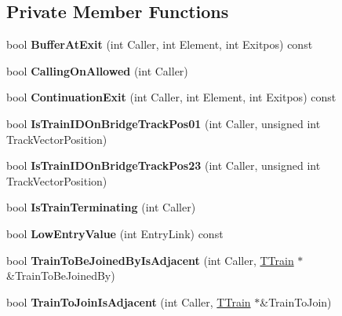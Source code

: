 \subsection*{Private Member Functions}
\begin{DoxyCompactItemize}
\item 
\mbox{\label{class_t_train_a2e3e9fd7367a9333b7550b225d328d13}} 
bool {\bfseries Buffer\+At\+Exit} (int Caller, int Element, int Exitpos) const
\item 
\mbox{\label{class_t_train_a4524b72ef62ef2c1375f58fac05929ee}} 
bool {\bfseries Calling\+On\+Allowed} (int Caller)
\item 
\mbox{\label{class_t_train_a36b7b4901add145605ba1e540801b6cf}} 
bool {\bfseries Continuation\+Exit} (int Caller, int Element, int Exitpos) const
\item 
\mbox{\label{class_t_train_a0a3a41dac70ba46da2f7f9fd03f2a63f}} 
bool {\bfseries Is\+Train\+I\+D\+On\+Bridge\+Track\+Pos01} (int Caller, unsigned int Track\+Vector\+Position)
\item 
\mbox{\label{class_t_train_a6cbff3229246b7a156cd64a531aa60a6}} 
bool {\bfseries Is\+Train\+I\+D\+On\+Bridge\+Track\+Pos23} (int Caller, unsigned int Track\+Vector\+Position)
\item 
\mbox{\label{class_t_train_a89e17b8d82633276576e365c980e718a}} 
bool {\bfseries Is\+Train\+Terminating} (int Caller)
\item 
\mbox{\label{class_t_train_ac2f3802b0d193d220ec6d19e2a6fc7ed}} 
bool {\bfseries Low\+Entry\+Value} (int Entry\+Link) const
\item 
\mbox{\label{class_t_train_ab4fefd748946d8530bca23a7699d0abc}} 
bool {\bfseries Train\+To\+Be\+Joined\+By\+Is\+Adjacent} (int Caller, \mbox{\hyperlink{class_t_train}{T\+Train}} $\ast$\&Train\+To\+Be\+Joined\+By)
\item 
\mbox{\label{class_t_train_a23b7b40bba00cae3550bb1a30670c249}} 
bool {\bfseries Train\+To\+Join\+Is\+Adjacent} (int Caller, \mbox{\hyperlink{class_t_train}{T\+Train}} $\ast$\&Train\+To\+Join)

\end{DoxyCompactItemize}
